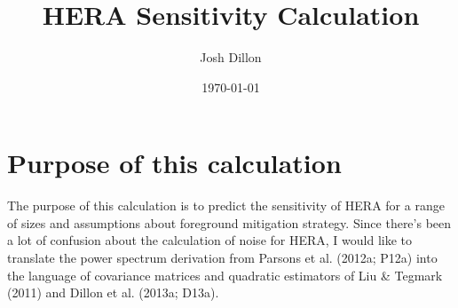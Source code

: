 \documentclass[]{article}
\begin{document}
\title{HERA Sensitivity Calculation}
\author{Josh Dillon}
\date{\today} 
\maketitle


\section{Purpose of this calculation}
The purpose of this calculation is to predict the sensitivity of HERA for a range of sizes and assumptions about foreground mitigation strategy.  Since there's been a lot of confusion about the calculation of noise for HERA, I would like to translate the power spectrum derivation from Parsons et al. (2012a; P12a) into the language of covariance matrices and quadratic estimators of Liu \& Tegmark (2011) and Dillon et al. (2013a; D13a).
\end{document}

